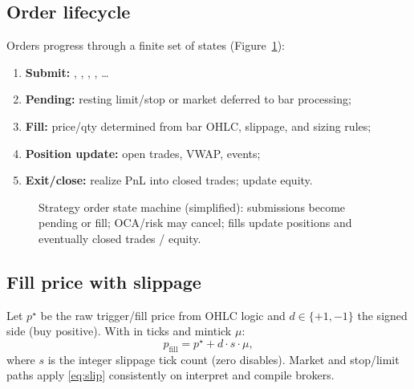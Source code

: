 \documentclass[11pt,a4paper]{article}
\begin{document}
\subsection{Order lifecycle}
Orders progress through a finite set of states (Figure~\ref{fig:order-sm}):
\begin{enumerate}[leftmargin=*]
  \item \textbf{Submit:} , ,
    , , \ldots
  \item \textbf{Pending:} resting limit/stop or market deferred to bar
    processing;
  \item \textbf{Fill:} price/qty determined from bar OHLC, slippage, and
    sizing rules;
  \item \textbf{Position update:} open trades, VWAP, events;
  \item \textbf{Exit/close:} realize PnL into closed trades; update equity.
\end{enumerate}

\begin{figure}[t]
\centering
{}
\caption{Strategy order state machine (simplified): submissions become pending
or fill; OCA/risk may cancel; fills update positions and eventually closed
trades / equity.}
\label{fig:order-sm}
\end{figure}

\subsection{Fill price with slippage}
Let $p^{\star}$ be the raw trigger/fill price from OHLC logic and $d\in\{+1,-1\}$
the signed side (buy positive). With  in ticks and mintick
$\mu$:
\begin{equation}
  p_{\mathrm{fill}} = p^{\star} + d\cdot s\cdot\mu,
  \label{eq:slip}
\end{equation}
where $s$ is the integer slippage tick count (zero disables).
Market and stop/limit paths apply \eqref{eq:slip} consistently on interpret
and compile brokers.
\end{document}
